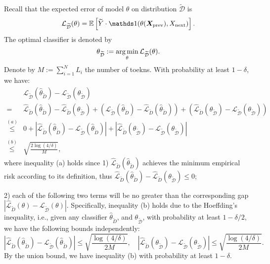 Recall that the expected error of model $\theta$ on distribution $\mathcal {\widetilde D}$ is 
$$
{\mathcal{L}}_{{\mathcal {\widetilde D}}}(\theta) =  \E\left[ \widetilde Y \cdot \BR{(\theta(\bm X_{\text{prev}}), X_{\text{next}})}  \right].
$$
The optimal classifier is denoted by $$\theta_{\mathcal {\widetilde D}}:=\operatorname*{arg\,min}_\theta {\mathcal L}_{\mathcal {\widetilde D}}(\theta).$$ 
Denote by $M:=\sum_{i=1}^N L_i$ the number of toekns. With probability at least $1-\delta$, we have:
\begin{equation*}
    \begin{split}
      &  {\mathcal L}_{\mathcal {\widetilde D}}(\hat \theta_{\widetilde D}) - {\mathcal L}_{\mathcal {\widetilde D}}(\theta_{\mathcal {\widetilde D}}) \\
    = & \hat {\mathcal L}_{\widetilde D}(\hat \theta_{\widetilde D}) - \hat {\mathcal L}_{\widetilde D}(\theta_{\mathcal {\widetilde D}})
    + \left( {\mathcal L}_{\mathcal {\widetilde D}}(\hat \theta_{\widetilde D}) 
    - \hat {\mathcal L}_{\widetilde D}(\hat \theta_{\widetilde D})\right)   + \left(\hat {\mathcal L}_{\widetilde D}(\theta_{\mathcal {\widetilde D}})
    - {\mathcal L}_{\mathcal {\widetilde D}}(\theta_{\mathcal {\widetilde D}}) \right)\\ 
  \overset{(a)}{\le} & 0 +  { |\hat {\mathcal L}_{\widetilde D}(\hat \theta_{\widetilde D}) - {\mathcal L}_{\mathcal {\widetilde D}}(\hat \theta_{\widetilde D})| + |\hat {\mathcal L}_{\widetilde D}(\theta_{\mathcal {\widetilde D}}) - {\mathcal L}_{\mathcal {\widetilde D}}(\theta_{\mathcal {\widetilde D}})|}  \\
  \overset{(b)}{\le} &  \sqrt{\frac{2\log({4}/\delta)}{M}},
    \end{split}
\end{equation*}
where inequality (a) holds since 1) $\hat {\mathcal L}_{\widetilde D}(\hat \theta_{\widetilde D})$ achieves the minimum empirical risk according to its definition, thus $\hat {\mathcal L}_{\widetilde D}(\hat \theta_{\widetilde D}) - \hat {\mathcal L}_{\widetilde D}(\theta_{\mathcal {\widetilde D}})\le 0$; {2) each of the following two terms will be no greater than the corresponding gap $|\hat {\mathcal L}_{\widetilde D}(\theta) - {\mathcal L}_{\mathcal {\widetilde D}}(\theta)|$. Specifically, inequality (b) holds due to the Hoeffding’s inequality, i.e., given any classifier $\hat \theta_{\widetilde D}$, and $\theta_{\mathcal {\widetilde D}}$, with probability at least $1-\delta/2$, we have the following bounds independently:
\[
 |\hat {\mathcal L}_{\widetilde D}(\hat \theta_{\widetilde D}) - {\mathcal L}_{\mathcal {\widetilde D}}(\hat \theta_{\widetilde D})| \le \sqrt{\frac{\log(4/\delta)}{2M}}, \quad  |\hat {\mathcal L}_{\widetilde D}(\theta_{\mathcal {\widetilde D}}) - {\mathcal L}_{\mathcal {\widetilde D}}(\theta_{\mathcal {\widetilde D}})| \le \sqrt{\frac{\log(4/\delta)}{2M}}.
\]
By the union bound, we have inequality (b) with probability at least $1-\delta$.

}

